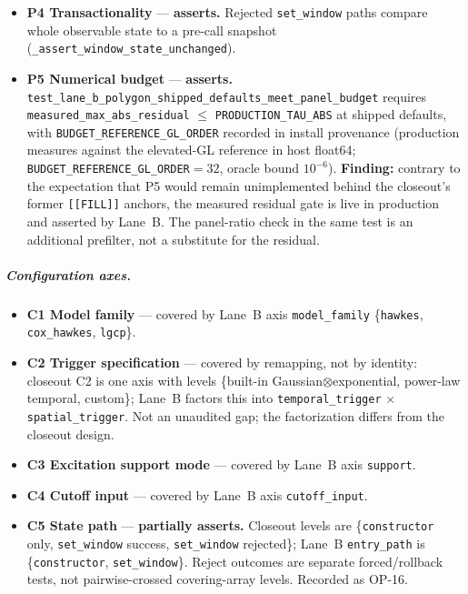 \documentclass[
  10pt,
]{article}
\providecommand{\tightlist}{%
  \setlength{\itemsep}{0pt}\setlength{\parskip}{0pt}}
\begin{document}
\begin{itemize}
\item \textbf{P4 Transactionality} --- \textbf{asserts.} Rejected \texttt{set\_window} paths compare whole observable state to a pre-call snapshot (\texttt{\_assert\_window\_state\_unchanged}).
\item \textbf{P5 Numerical budget} --- \textbf{asserts.} \texttt{test\_lane\_b\_polygon\_shipped\_defaults\_meet\_panel\_budget} requires \texttt{measured\_max\_abs\_residual} $\le$ \texttt{PRODUCTION\_TAU\_ABS} at shipped defaults, with \texttt{BUDGET\_REFERENCE\_GL\_ORDER} recorded in install provenance (production measures against the elevated-GL reference in host float64; \texttt{BUDGET\_REFERENCE\_GL\_ORDER}${}={}32$, oracle bound $10^{-6}$). \textbf{Finding:} contrary to the expectation that P5 would remain unimplemented behind the closeout's former \texttt{[[FILL]]} anchors, the measured residual gate is live in production and asserted by Lane~B. The panel-ratio check in the same test is an additional prefilter, not a substitute for the residual.
\end{itemize}

\subparagraph{Configuration axes.}
\begin{itemize}
\tightlist
\item \textbf{C1 Model family} --- covered by Lane~B axis \texttt{model\_family} \{\texttt{hawkes}, \texttt{cox\_hawkes}, \texttt{lgcp}\}.
\item \textbf{C2 Trigger specification} --- covered by remapping, not by identity: closeout C2 is one axis with levels \{built-in Gaussian$\otimes$exponential, power-law temporal, custom\}; Lane~B factors this into \texttt{temporal\_trigger} $\times$ \texttt{spatial\_trigger}. Not an unaudited gap; the factorization differs from the closeout design.
\item \textbf{C3 Excitation support mode} --- covered by Lane~B axis \texttt{support}.
\item \textbf{C4 Cutoff input} --- covered by Lane~B axis \texttt{cutoff\_input}.
\item \textbf{C5 State path} --- \textbf{partially asserts.} Closeout levels are \{\texttt{constructor} only, \texttt{set\_window} success, \texttt{set\_window} rejected\}; Lane~B \texttt{entry\_path} is \{\texttt{constructor}, \texttt{set\_window}\}. Reject outcomes are separate forced/rollback tests, not pairwise-crossed covering-array levels. Recorded as OP-16.
\end{itemize}
\end{document}
